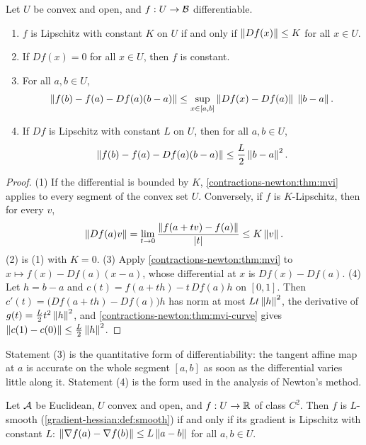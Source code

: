 \begin{notechapter}
\begin{corollary}\label{contractions-newton:cor:mvi}
Let $U$ be convex and open, and $f:U\to\mathcal{B}$ differentiable.
\begin{enumerate}[nosep]
  \item $f$ is Lipschitz with constant $K$ on $U$ if and only if
        $\left\|Df(x)\right\|\leq K$ for all $x\in U$.
  \item If $Df(x) = 0$ for all $x\in U$, then $f$ is constant.
  \item For all $a, b\in U$,
        \[
          \left\|f(b) - f(a) - Df(a)(b - a)\right\|
          \leq\sup_{x\in[a, b]}\left\|Df(x) - Df(a)\right\|\;\left\|b - a\right\| .
        \]
  \item If $Df$ is Lipschitz with constant $L$ on $U$, then for all
        $a, b\in U$,
        \[
          \left\|f(b) - f(a) - Df(a)(b - a)\right\|\leq\frac L2\left\|b - a\right\|^2 .
        \]
\end{enumerate}
\end{corollary}

\begin{proof}
(1) If the differential is bounded by $K$, \cref{contractions-newton:thm:mvi}
applies to every segment of the convex set $U$. Conversely, if $f$ is
$K$-Lipschitz, then for every $v$,
\[
  \left\|Df(a)v\right\| = \lim_{t\to0}\frac{\left\|f(a + tv) - f(a)\right\|}{\left|t\right|}
  \leq K\left\|v\right\| .
\]
(2) is (1) with $K = 0$. (3) Apply \cref{contractions-newton:thm:mvi} to
$x\mapsto f(x) - Df(a)(x - a)$, whose differential at $x$ is
$Df(x) - Df(a)$. (4) Let $h = b - a$ and
$c(t) = f(a + th) - t\,Df(a)h$ on $[0, 1]$. Then
$c'(t) = \bigl(Df(a + th) - Df(a)\bigr)h$ has norm at most
$Lt\left\|h\right\|^2$, the derivative of $g(t) = \frac L2t^2\left\|h\right\|^2$, and
\cref{contractions-newton:thm:mvi-curve} gives
$\left\|c(1) - c(0)\right\|\leq\frac L2\left\|h\right\|^2$.
\end{proof}

Statement (3) is the quantitative form of differentiability: the tangent
affine map at $a$ is accurate on the whole segment $[a, b]$ as soon as the
differential varies little along it. Statement (4) is the form used in the
analysis of Newton's method.

\begin{proposition}
\label{contractions-newton:prop:smooth}
Let $\mathcal{A}$ be Euclidean, $U$ convex and open, and $f:U\to\mathbb{R}$ of class
$C^2$. Then $f$ is $L$-smooth (\cref{gradient-hessian:def:smooth}) if and
only if its gradient is Lipschitz with constant $L$:
$\left\|\nabla f(a) - \nabla f(b)\right\|\leq L\left\|a - b\right\|$ for all $a, b\in U$.
\end{proposition}


\end{notechapter}
